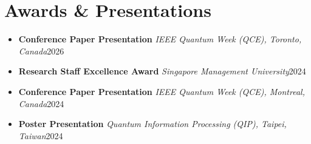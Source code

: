 \documentclass[letterpaper,11pt]{article}
\newcommand{\cvsection}[1]{\needspace{4\baselineskip}\section{#1}}
\newcommand{\resumeProjectHeading}[2]{%
  \needspace{2\baselineskip}
  \item {\small #1\hfill #2\par}
}
\newcommand{\resumeSubHeadingListStart}{\begin{itemize}[leftmargin=0pt,label={},itemsep=2.5pt,topsep=0pt,parsep=0pt]}
\newcommand{\resumeSubHeadingListEnd}{\end{itemize}}
\begin{document}
\cvsection{Awards \& Presentations}
\resumeSubHeadingListStart
  \resumeProjectHeading{\textbf{Conference Paper Presentation} \textbullet{} \textit{IEEE Quantum Week (QCE), Toronto, Canada}}{2026}
  \resumeProjectHeading{\textbf{Research Staff Excellence Award} \textbullet{} \textit{Singapore Management University}}{2024}
  \resumeProjectHeading{\textbf{Conference Paper Presentation} \textbullet{} \textit{IEEE Quantum Week (QCE), Montreal, Canada}}{2024}
  \resumeProjectHeading{\textbf{Poster Presentation} \textbullet{} \textit{Quantum Information Processing (QIP), Taipei, Taiwan}}{2024}
\resumeSubHeadingListEnd


\end{document}
